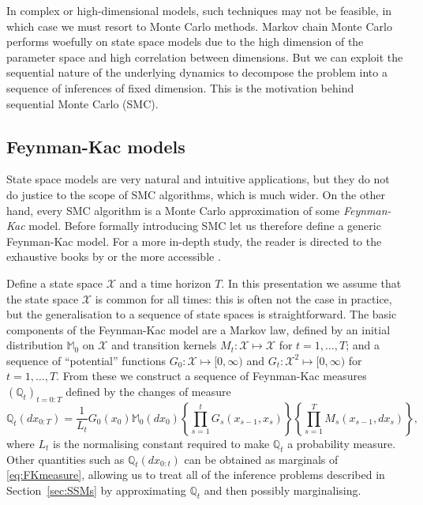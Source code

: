 In complex or high-dimensional models, such techniques may not be feasible, in which case we must resort to Monte Carlo methods.
Markov chain Monte Carlo performs woefully on state space models due to the high dimension of the parameter space and high correlation between dimensions. 
But we can exploit the sequential nature of the underlying dynamics to decompose the problem into a sequence of inferences of fixed dimension.
This is the motivation behind sequential Monte Carlo (SMC).


\subsection{Feynman-Kac models}
\label{sec:FKmodels}

State space models are very natural and intuitive applications, but they do not do justice to the scope of SMC algorithms, which is much wider.
On the other hand, 
every SMC algorithm is a Monte Carlo approximation of some \emph{Feynman-Kac} model.
Before formally introducing SMC let us therefore define a generic Feynman-Kac model.
For a more in-depth study, the reader is directed to the exhaustive books by \textcite{delmoral2004, delmoral2013} or the more accessible \textcite[Chapter 5]{chopin2020}.

Define a state space $\mathcal{X}$ and a time horizon $T$. In this presentation we assume that the state space $\mathcal{X}$ is common for all times: this is often not the case in practice, but the generalisation to a sequence of state spaces is straightforward.
The basic components of the Feynman-Kac model are a Markov law, defined by an initial distribution $\mathbb{M}_0$ on $\mathcal{X}$ and transition kernels $M_t: \mathcal{X} \mapsto \mathcal{X}$ for $t=1,\dots,T$; and a sequence of ``potential'' functions $G_0 : \mathcal{X} \mapsto [0,\infty)$  and $G_t : \mathcal{X}^2 \mapsto [0,\infty)$ for $t=1,\dots,T$.
From these we construct a sequence of Feynman-Kac measures $(\mathbb{Q}_t)_{t=0:T}$ defined by the changes of measure
\begin{equation}
\mathbb{Q}_t (dx_{0:T}) = \frac{1}{L_t} G_0(x_0) \mathbb{M}_0(dx_0)
        \left\{ \prod_{s=1}^t G_s(x_{s-1}, x_s) \right\} 
        \left\{ \prod_{s=1}^T M_s(x_{s-1}, dx_s) \right\} , \label{eq:FKmeasure}
\end{equation}
where $L_t$ is the normalising constant required to make $\mathbb{Q}_t$ a probability measure. Other quantities such as $\mathbb{Q}_t (dx_{0:t})$ can be obtained as marginals of \eqref{eq:FKmeasure}, allowing us to treat all of the inference problems described in Section~\ref{sec:SSMs} by approximating $\mathbb{Q}_t$ and then possibly marginalising.

